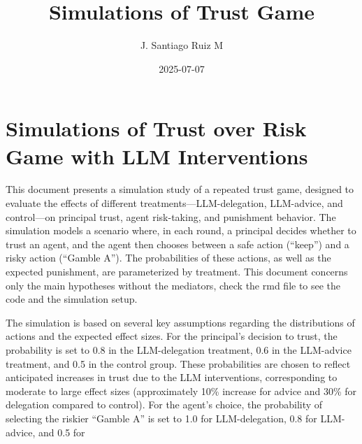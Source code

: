\documentclass[
]{article}
\title{Simulations of Trust Game}
\author{J. Santiago Ruiz M}
\date{2025-07-07}
\begin{document}
\maketitle

\section{Simulations of Trust over Risk Game with LLM
Interventions}\label{simulations-of-trust-over-risk-game-with-llm-interventions}

This document presents a simulation study of a repeated trust game,
designed to evaluate the effects of different
treatments---LLM-delegation, LLM-advice, and control---on principal
trust, agent risk-taking, and punishment behavior. The simulation models
a scenario where, in each round, a principal decides whether to trust an
agent, and the agent then chooses between a safe action (``keep'') and a
risky action (``Gamble A''). The probabilities of these actions, as well
as the expected punishment, are parameterized by treatment. This
document concerns only the main hypotheses without the mediators, check
the rmd file to see the code and the simulation setup.

The simulation is based on several key assumptions regarding the
distributions of actions and the expected effect sizes. For the
principal's decision to trust, the probability is set to 0.8 in the
LLM-delegation treatment, 0.6 in the LLM-advice treatment, and 0.5 in
the control group. These probabilities are chosen to reflect anticipated
increases in trust due to the LLM interventions, corresponding to
moderate to large effect sizes (approximately 10\% increase for advice
and 30\% for delegation compared to control). For the agent's choice,
the probability of selecting the riskier ``Gamble A'' is set to 1.0 for
LLM-delegation, 0.8 for LLM-advice, and 0.5 for
\end{document}
